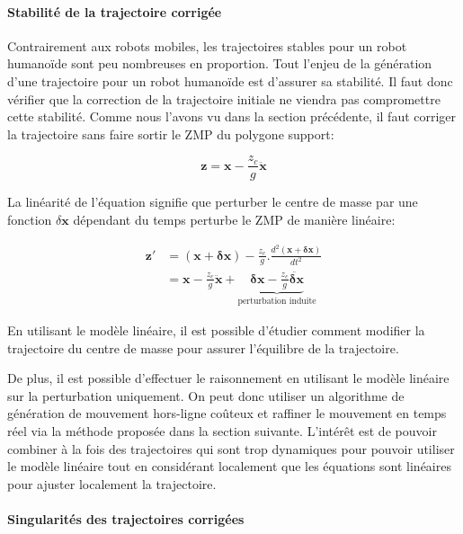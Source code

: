 \paragraph{Stabilité de la trajectoire corrigée}


Contrairement aux robots mobiles, les trajectoires stables pour un
robot humanoïde sont peu nombreuses en proportion. Tout l'enjeu de la
génération d'une trajectoire pour un robot humanoïde est d'assurer sa
stabilité. Il faut donc vérifier que la correction de la trajectoire
initiale ne viendra pas compromettre cette stabilité. Comme nous
l'avons vu dans la section précédente, il faut corriger la trajectoire
sans faire sortir le ZMP du polygone
support:

\begin{equation} \label{eq:zmp2}
  \mathbf{z} = \mathbf{x}  - \frac{z_c}{g} \ddot{\mathbf{x}}
\end{equation}

La linéarité de l'équation signifie que perturber le centre de masse
par une fonction \mbox{$\delta \mathbf{x}$} dépendant du temps
perturbe le ZMP de manière linéaire:

\begin{equation} \label{eq:zmpperturbation}
\begin{split}
  \mathbf{z'} &= (\mathbf{x} + \mathbf{\delta x}) - \frac{z_c}{g} .
  \frac{d^2 (\mathbf{x} + \mathbf{\delta x})}{d t^2}\\
  &= \mathbf{x} - \frac{z_c}{g} \ddot{\mathbf{x}} +
  \underbrace{\mathbf{\delta x} - \frac{z_c}{g} \ddot{\mathbf{\delta
        x}}}_{\text{perturbation induite}}
\end{split}
\end{equation}

En utilisant le modèle linéaire, il est possible d'étudier comment
modifier la trajectoire du centre de masse pour assurer l'équilibre de
la trajectoire.

De plus, il est possible d'effectuer le raisonnement en utilisant le
modèle linéaire sur la perturbation uniquement. On peut donc utiliser
un algorithme de génération de mouvement hors-ligne coûteux et
raffiner le mouvement en temps réel via la méthode proposée dans la
section suivante. L'intérêt est de pouvoir combiner à la fois des
trajectoires qui sont trop dynamiques pour pouvoir utiliser le modèle
linéaire tout en considérant localement que les équations sont
linéaires pour ajuster localement la trajectoire.


\paragraph{Singularités des trajectoires corrigées}

